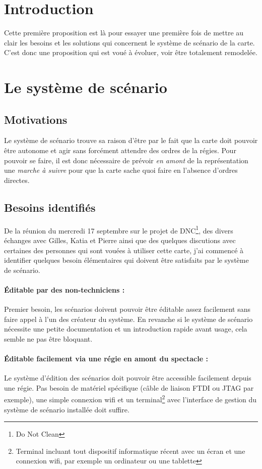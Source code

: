 
\tableofcontents

\newpage

\setcounter{page}{1}

\section{Introduction}
Cette première proposition est là pour essayer une première fois de mettre au clair les besoins et les solutions qui concernent le système de scénario de la carte. C'est donc une proposition qui est voué à évoluer, voir être totalement remodelée.

\section{Le système de scénario}

\subsection{Motivations}
Le système de scénario trouve sa raison d'être par le fait que la carte doit pouvoir être autonome et agir sans forcément attendre des ordres de la régies. Pour pouvoir se faire, il est donc nécessaire de prévoir \textit{en amont} de la représentation une \textit{marche à suivre} pour que la carte sache quoi faire en l'absence d'ordres directes.
\subsection{Besoins identifiés}
De la réunion du mercredi 17 septembre sur le projet de DNC\footnote{Do Not Clean}, des divers échanges avec Gilles, Katia et Pierre ainsi que des quelques discutions avec certaines des personnes qui sont vouées à utiliser cette carte, j'ai commencé à identifier quelques besoin élémentaires qui doivent être satisfaits par le système de scénario.
\paragraph{Éditable par des non-techniciens :}
Premier besoin, les scénarios doivent pouvoir être éditable assez facilement sans faire appel à l'un des créateur du système. En revanche si le système de scénario nécessite une petite documentation et un introduction rapide avant usage, cela semble ne pas être bloquant.
\paragraph{Éditable facilement via une régie en amont du spectacle :}
Le système d'édition des scénarios doit pouvoir être accessible facilement depuis une régie. Pas besoin de matériel spécifique (câble de liaison FTDI ou JTAG par exemple), une simple connexion wifi et un terminal\footnote{Terminal incluant tout dispositif informatique récent avec un écran et une connexion wifi, par exemple un ordinateur ou une tablette} avec l'interface de gestion du système de scénario installée doit suffire.
